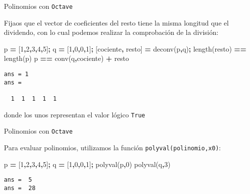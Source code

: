 \documentclass[
  ignorenonframetext,
]{beamer}
\newenvironment{Shaded}{\begin{snugshade}}{\end{snugshade}}
\newcommand{\FloatTok}[1]{\textcolor[rgb]{0.00,0.00,0.81}{#1}}
\newcommand{\FunctionTok}[1]{\textcolor[rgb]{0.00,0.00,0.00}{#1}}
\newcommand{\NormalTok}[1]{#1}
\newcommand{\OperatorTok}[1]{\textcolor[rgb]{0.81,0.36,0.00}{\textbf{#1}}}
\begin{document}
\begin{frame}[fragile]{Polinomios con \texttt{Octave}}
\protect\hypertarget{polinomios-con-octave-7}{}

Fijaos que el vector de coeficientes del resto tiene la misma longitud
que el dividendo, con lo cual podemos realizar la comprobación de la
división:

\begin{Shaded}
\begin{Highlighting}[]
\NormalTok{p }\OperatorTok{=}\NormalTok{ [}\FloatTok{1}\OperatorTok{,}\FloatTok{2}\OperatorTok{,}\FloatTok{3}\OperatorTok{,}\FloatTok{4}\OperatorTok{,}\FloatTok{5}\NormalTok{]}\OperatorTok{;}
\NormalTok{q }\OperatorTok{=}\NormalTok{ [}\FloatTok{1}\OperatorTok{,}\FloatTok{0}\OperatorTok{,}\FloatTok{0}\OperatorTok{,}\FloatTok{1}\NormalTok{]}\OperatorTok{;}
\NormalTok{[cociente}\OperatorTok{,}\NormalTok{ resto] }\OperatorTok{=} \FunctionTok{deconv}\NormalTok{(p}\OperatorTok{,}\NormalTok{q)}\OperatorTok{;}
\FunctionTok{length}\NormalTok{(resto) }\OperatorTok{==} \FunctionTok{length}\NormalTok{(p)}
\NormalTok{p }\OperatorTok{==} \FunctionTok{conv}\NormalTok{(q}\OperatorTok{,}\NormalTok{cociente) }\OperatorTok{+}\NormalTok{ resto}
\end{Highlighting}
\end{Shaded}

\begin{verbatim}
ans = 1
ans =

  1  1  1  1  1
\end{verbatim}

donde los unos representan el valor lógico \texttt{True}

\end{frame}

\begin{frame}[fragile]{Polinomios con \texttt{Octave}}
\protect\hypertarget{polinomios-con-octave-8}{}

Para evaluar polinomios, utilizamos la función
\texttt{polyval(polinomio,x0)}:

\begin{Shaded}
\begin{Highlighting}[]
\NormalTok{p }\OperatorTok{=}\NormalTok{ [}\FloatTok{1}\OperatorTok{,}\FloatTok{2}\OperatorTok{,}\FloatTok{3}\OperatorTok{,}\FloatTok{4}\OperatorTok{,}\FloatTok{5}\NormalTok{]}\OperatorTok{;}
\NormalTok{q }\OperatorTok{=}\NormalTok{ [}\FloatTok{1}\OperatorTok{,}\FloatTok{0}\OperatorTok{,}\FloatTok{0}\OperatorTok{,}\FloatTok{1}\NormalTok{]}\OperatorTok{;}
\FunctionTok{polyval}\NormalTok{(p}\OperatorTok{,}\FloatTok{0}\NormalTok{) }
\FunctionTok{polyval}\NormalTok{(q}\OperatorTok{,}\FloatTok{3}\NormalTok{)}
\end{Highlighting}
\end{Shaded}

\begin{verbatim}
ans =  5
ans =  28
\end{verbatim}

\end{frame}
\end{document}
